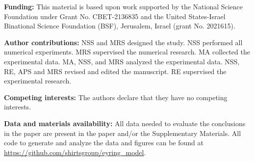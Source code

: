 \documentclass[12pt]{article}
\begin{document}
\noindent \textbf{Funding:} This material is based upon work supported by the National Science Foundation under Grant No. CBET-2136835 and the United States-Israel Binational Science Foundation (BSF), Jerusalem, Israel (grant No. 2021615).

\noindent \textbf{Author contributions:} NSS and MRS designed the study. NSS performed all numerical experiments. MRS supervised the numerical research. 
MA collected the experimental data. MA, NSS, and MRS analyzed the experimental data. NSS, RE, APS and MRS revised and edited the manuscript. RE supervised the experimental research.

\noindent \textbf{Competing interests:} The authors declare that they have no competing interests.

\noindent \textbf{Data and materials availability:} All data needed to evaluate the conclusions in the paper are present in the paper and/or the Supplementary Materials. All code to generate and analyze the data and figures can be found at \url{https://github.com/shirtsgroup/eyring_model}.


\end{document}
